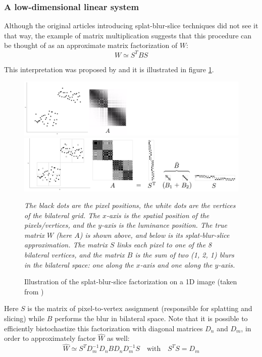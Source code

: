 \documentclass{article}
\begin{document}
\subsubsection{A low-dimensional linear system}

Although the original articles introducing splat-blur-slice techniques did not see it that way, the example of matrix multiplication suggests that this procedure can be thought of as an approximate matrix factorization of $W$:
\begin{equation}
    W \simeq S^T B S
\end{equation}

This interpretation was proposed by \cite{barron_fast_2015} and it is illustrated in figure \ref{fig:SBS2}.

\begin{figure}
    \centering
    \hspace{0.3cm}\includegraphics[width=14cm]{pictures/SBS2_0.png}
    \includegraphics[width=14cm]{pictures/SBS2.png}
    \caption{Illustration of the splat-blur-slice factorization on a 1D image (taken from \cite{barron_fast_2015})}
    {\it \small The black dots are the pixel positions, the white dots are the vertices of the bilateral grid. The $x$-axis is the spatial position of the pixels/vertices, and the $y$-axis is the luminance position. The true matrix $W$ (here $A$) is shown above, and below is its splat-blur-slice approximation. The matrix $S$ links each pixel to one of the 8 bilateral vertices, and the matrix $B$ is the sum of two (1, 2, 1) blurs in the bilateral space: one along the $x$-axis and one along the $y$-axis.}
    \label{fig:SBS2}
\end{figure}

\medskip

Here $S$ is the matrix of pixel-to-vertex assignment (responsible for splatting and slicing) while $B$ performs the blur in bilateral space. Note that it is possible to efficiently bistochastize this factorization with diagonal matrices $D_n$ and $D_m$, in order to approximately factor $\hat{W}$ as well:
\begin{equation}
    \hat{W} \simeq S^T D_m^{-1} D_n B D_n D_m^{-1} S \quad \text{with} \quad S^T S = D_m
\end{equation}
\end{document}
